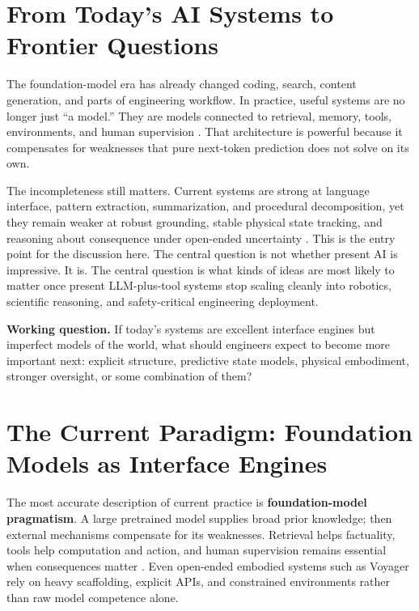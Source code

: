 \documentclass[12pt]{article}
\begin{document}
\section{From Today's AI Systems to Frontier Questions}

The foundation-model era has already changed coding, search, content generation, and parts of engineering workflow. In practice, useful systems are no longer just ``a model.'' They are models connected to retrieval, memory, tools, environments, and human supervision \cite{bommasani2021foundation}. That architecture is powerful because it compensates for weaknesses that pure next-token prediction does not solve on its own.

The incompleteness still matters. Current systems are strong at language interface, pattern extraction, summarization, and procedural decomposition, yet they remain weaker at robust grounding, stable physical state tracking, and reasoning about consequence under open-ended uncertainty \cite{wang2023newton}. This is the entry point for the discussion here. The central question is not whether present AI is impressive. It is. The central question is what kinds of ideas are most likely to matter once present LLM-plus-tool systems stop scaling cleanly into robotics, scientific reasoning, and safety-critical engineering deployment.

\begin{def-box}
\textbf{Working question.} If today's systems are excellent interface engines but imperfect models of the world, what should engineers expect to become more important next: explicit structure, predictive state models, physical embodiment, stronger oversight, or some combination of them?
\end{def-box}

\section{The Current Paradigm: Foundation Models as Interface Engines}

The most accurate description of current practice is \textbf{foundation-model pragmatism}. A large pretrained model supplies broad prior knowledge; then external mechanisms compensate for its weaknesses. Retrieval helps factuality, tools help computation and action, and human supervision remains essential when consequences matter \cite{bommasani2021foundation}. Even open-ended embodied systems such as Voyager rely on heavy scaffolding, explicit APIs, and constrained environments rather than raw model competence alone.
\end{document}

